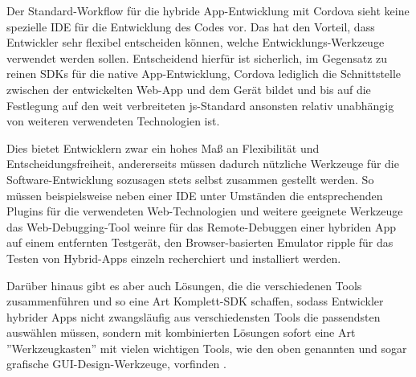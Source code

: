 Der Standard-Workflow für die hybride App-Entwicklung mit Cordova sieht keine spezielle IDE für die Entwicklung des Codes vor. 
Das hat den Vorteil, dass Entwickler sehr flexibel entscheiden können, welche Entwicklungs-Werkzeuge verwendet werden sollen. 
Entscheidend hierfür ist sicherlich, im Gegensatz zu reinen SDKs für die native App-Entwicklung, Cordova lediglich die Schnittstelle zwischen der entwickelten Web-App und dem Gerät bildet und bis auf die Festlegung auf den weit verbreiteten \gls{js}-Standard ansonsten relativ unabhängig von weiteren verwendeten Technologien ist.

Dies bietet Entwicklern zwar ein hohes Maß an Flexibilität und Entscheidungsfreiheit, andererseits müssen dadurch nützliche Werkzeuge für die Software-Entwicklung sozusagen stets selbst zusammen gestellt werden.
 So müssen beispielsweise neben einer IDE unter Umständen die entsprechenden Plugins für die verwendeten Web-Technologien und weitere geeignete Werkzeuge das Web-Debugging-Tool \gls{weinre} für das Remote-Debuggen einer hybriden App auf einem entfernten Testgerät, den Browser-basierten Emulator \gls{ripple} für das Testen von Hybrid-Apps einzeln recherchiert und installiert werden. 

Darüber hinaus gibt es aber auch Lösungen, die die verschiedenen Tools zusammenführen und so eine Art Komplett-SDK schaffen, sodass Entwickler hybrider Apps nicht zwangsläufig aus verschiedensten Tools die passendsten auswählen müssen, sondern mit kombinierten Lösungen sofort eine Art ”Werkzeugkasten”  mit vielen wichtigen Tools, wie den oben genannten und sogar grafische GUI-Design-Werkzeuge, vorfinden \cite{DaVinci, xdk, sencha}.




